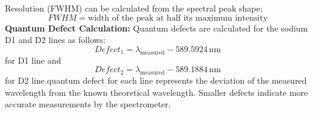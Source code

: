 \documentclass{article}
\begin{document}
Resolution (FWHM) can be calculated from the spectral peak shape:\n\begin{equation*}FWHM = \text{width of the peak at half its maximum intensity}\end{equation*}\n\n\textbf{Quantum Defect Calculation:}
Quantum defects are calculated for the sodium D1 and D2 lines as follows:
\begin{equation*}Defect_1 = \lambda_{\text{measured}} - 589.5924 \, \text{nm}\end{equation*}for D1 line and\begin{equation*}Defect_2 = \lambda_{\text{measured}} - 589.1884 \, \text{nm}\end{equation*}for D2 line.\n\nThe quantum defect for each line represents the deviation of the measured wavelength from the known theoretical wavelength.
Smaller defects indicate more accurate measurements by the spectrometer.
\end{document}
